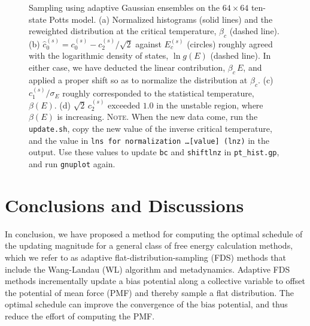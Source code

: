 \documentclass[reprint, superscriptaddress, floatfix]{revtex4-1}
\newcommand{\note}[1]{{\color{DarkGreen}\footnotesize \textsc{Note.} #1}}
\begin{document}
\begin{figure}[h]\centering
  \caption{
    \label{fig:pt_hist}
    Sampling using adaptive Gaussian ensembles
    on the $64 \times 64$ ten-state Potts model.
    (a) Normalized histograms (solid lines)
    and the reweighted distribution
    at the critical temperature, $\beta_c$ (dashed line).
    (b) $\hat c_0^{(s)} = c_0^{(s)} - c_2^{(s)}/\sqrt 2$
    against $E_c^{(s)}$ (circles)
    roughly agreed with the logarithmic density of states,
    $\ln g(E)$ (dashed line).
    In either case,
    we have deducted the linear contribution, $\beta_c \, E$,
    and applied a proper shift so as to normalize
    the distribution at $\beta_c$.
    (c) $c_1^{(s)}/\sigma_E$ roughly corresponded to
    the statistical temperature, $\beta(E)$.
    (d) $\sqrt 2 \, c_2^{(s)}$
    exceeded $1.0$ in the unstable region,
    where $\beta(E)$ is increasing.
    \note{When the new data come,
    run the \texttt{update.sh},
    copy the new value of the inverse critical temperature,
    and the value in \texttt{lns for normalization \dots [value] (lnz)}
    in the output.
    Use these values to update \texttt{bc} and \texttt{shiftlnz}
    in \texttt{pt\_hist.gp}, and run \texttt{gnuplot} again.  }%
  }
\end{figure}


\section{\label{sec:conclusion}
Conclusions and Discussions}



In conclusion,
we have proposed a method for computing
the optimal schedule of the updating magnitude
for a general class of free energy calculation methods,
which we refer to as adaptive flat-distribution-sampling (FDS) methods
that include the Wang-Landau (WL) algorithm and metadynamics.
%
Adaptive FDS methods
incrementally update a bias potential
along a collective variable
to offset the potential of mean force (PMF)
and thereby sample a flat distribution.
%
The optimal schedule can improve the convergence
of the bias potential,
and thus reduce the effort
of computing the PMF.
\end{document}
